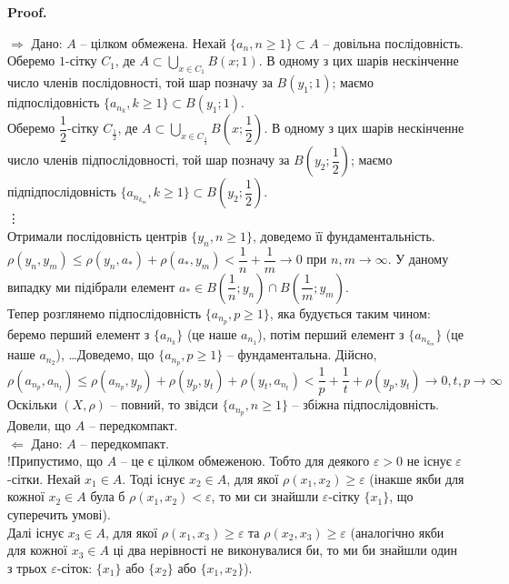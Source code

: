 \documentclass[a4paper, 10pt]{article}
\makeatletter
\def\rightproof{$\boxed{\Rightarrow}$ }
\def\leftproof{$\boxed{\Leftarrow}$ }
\theoremstyle{theoremdd}
\theoremstyle{theoremdd}
\theoremstyle{theoremdd}
\theoremstyle{theoremdd}
\theoremstyle{theoremdd}
\theoremstyle{theoremdd}
\theoremstyle{theoremdd}
\theoremstyle{theoremdd}
\renewenvironment{proof}[1][Proof.\\]{\par
\pushQED{\hfill \qed}%
\normalfont \topsep6\p@\@plus6\p@\relax
\trivlist
\item\relax
{\bfseries
#1\@addpunct{.}}\hspace\labelsep\ignorespaces
}{%
\popQED\endtrivlist\@endpefalse
}
\makeatother
\begin{document}
\begin{proof}
\rightproof Дано: $A$ -- цілком обмежена. Нехай $\{a_n, n \geq 1\} \subset A$ -- довільна послідовність. \\
Оберемо $1$-сітку $C_1$, де $A \subset \displaystyle\bigcup_{x \in C_1} B(x;1)$. В одному з цих шарів нескінченне число членів послідовності, той шар позначу за $B(y_1;1)$; маємо підпослідовність $\{a_{n_k}, k \geq 1\} \subset B(y_1;1)$.\\
Оберемо $\dfrac{1}{2}$-сітку $C_{\frac{1}{2}}$, де $A \subset \displaystyle\bigcup_{x \in C_{\frac{1}{2}}} B\left(x;\dfrac{1}{2}\right)$. В одному з цих шарів нескінченне число членів підпослідовності, той шар позначу за $B\left(y_2;\dfrac{1}{2}\right)$; маємо підпідпослідовність $\{a_{n_{k_m}}, k \geq 1\} \subset B\left(y_2;\dfrac{1}{2}\right)$.\\
\vdots \\
Отримали послідовність центрів $\{y_n, n \geq 1\}$, доведемо її фундаментальність.\\
$\rho(y_n,y_m) \leq \rho(y_n,a_*) + \rho(a_*,y_m) < \dfrac{1}{n} + \dfrac{1}{m} \to 0$ при $n,m \to \infty$. У даному випадку ми підібрали елемент $a_* \in B\left( \dfrac{1}{n};y_n \right) \cap B\left( \dfrac{1}{m};y_m \right)$.\\
Тепер розглянемо підпослідовність $\{a_{n_p}, p \geq 1\}$, яка будується таким чином: беремо перший елемент з $\{a_{n_k}\}$ (це наше $a_{n_1}$), потім перший елемент з $\{a_{n_{k_m}}\}$ (це наше $a_{n_2}$), \dots Доведемо, що $\{a_{n_p}, p \geq 1\}$ -- фундаментальна. Дійсно,\\
$\rho(a_{n_p}, a_{n_t}) \leq \rho(a_{n_p}, y_p) + \rho(y_p,y_t) + \rho(y_t,a_{n_t}) < \dfrac{1}{p} + \dfrac{1}{t} + \rho(y_p,y_t) \to 0, t,p \to \infty$\\
Оскільки $(X,\rho)$ -- повний, то звідси $\{a_{n_p}, n \geq 1\}$ -- збіжна підпослідовність. Довели, що $A$ -- передкомпакт.
\bigskip \\
\leftproof Дано: $A$ -- передкомпакт.\\
!Припустимо, що $A$ -- це є цілком обмеженою. Тобто для деякого $\varepsilon > 0$ не існує $\varepsilon$-сітки. Нехай $x_1 \in A$. Тоді існує $x_2 \in A$, для якої $\rho(x_1,x_2) \geq \varepsilon$ (інакше якби для кожної $x_2 \in A$ була б $\rho(x_1,x_2) < \varepsilon$, то ми си знайшли $\varepsilon$-сітку $\{x_1\}$, що суперечить умові).\\
Далі існує $x_3 \in A$, для якої $\rho(x_1,x_3) \geq \varepsilon$ та $\rho(x_2,x_3) \geq \varepsilon$ (аналогічно якби для кожної $x_3 \in A$ ці два нерівності не виконувалися би, то ми би знайшли один з трьох $\varepsilon$-сіток: $\{x_1\}$ або $\{x_2\}$ або $\{x_1,x_2\}$).\\

\end{proof}
\end{document}
